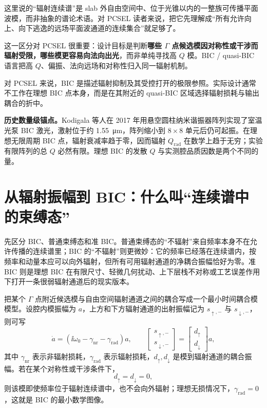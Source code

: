 这里说的“辐射连续谱”是 slab 外自由空间中、位于光锥以内的一整族可传播平面波模，而非抽象的谱论术语。对 PCSEL 读者来说，把它先理解成“所有允许向上、向下逃逸的远场平面波通道的连续集合”就足够了。

这一区分对 PCSEL 很重要：设计目标是判断\textbf{哪些 $\Gamma$ 点候选模因对称性或干涉而辐射受限，哪些模更容易向法向出光}，而非单纯寻找高 $Q$ 模。BIC / quasi-BIC 语言把高 $Q$、偏振、法向远场和对称性归入同一辐射机制。

\begin{IntuitionBox}
对 PCSEL 来说，BIC 是描述辐射抑制及其受控打开的极限参照。实际设计通常不工作在理想 BIC 点本身，而是在其附近的 quasi-BIC 区域选择辐射损耗与输出耦合的折中。
\end{IntuitionBox}

\begin{ExampleBox}
\textbf{历史数量级锚点。}Kodigala 等人在 2017 年用悬空圆柱纳米谐振器阵列实现了室温光泵 BIC 激光，激射位于约 \SI{1.55}{\micro\meter}，阵列缩小到 $8\times8$ 单元后仍可起振\cite{kodigala2017}。在理想无限周期 BIC 点，辐射衰减率趋于零，因而辐射 $Q_{\mathrm{rad}}$ 在数学上趋于无穷；实验有限阵列的总 $Q$ 必然有限。理想 BIC 的发散 $Q$ 与实测腔品质因数是两个不同的量。
\end{ExampleBox}

\section{从辐射振幅到 BIC：什么叫“连续谱中的束缚态”}
先区分 BIC、普通束缚态和准 BIC。普通束缚态的“不辐射”来自频率本身不在允许传播的连续谱里；BIC 的“不辐射”则更微妙：它的频率已经落在连续谱内，按频率和动量本应可以向外辐射，但所有可用辐射通道的净耦合振幅恰好为零。准 BIC 则是理想 BIC 在有限尺寸、轻微几何扰动、上下层栈不对称或工艺误差作用下打开一条很弱辐射通道后的现实版本。

把某个 $\Gamma$ 点附近候选模与自由空间辐射通道之间的耦合写成一个最小时间耦合模模型。设腔内模振幅为 $a$，上方和下方辐射通道的出射振幅记为 $s_{\uparrow,-}$ 与 $s_{\downarrow,-}$，则可写
\begin{equation}
\dot a
=
\left(\ii\omega_0-\gamma_{\mathrm{nr}}-\gamma_{\mathrm{rad}}\right)a,
\qquad
\begin{bmatrix}
s_{\uparrow,-}\\
s_{\downarrow,-}
\end{bmatrix}
=
\begin{bmatrix}
d_\uparrow\\
d_\downarrow
\end{bmatrix} a,
\label{eq:bic_tcmt}
\end{equation}
其中 $\gamma_{\mathrm{nr}}$ 表示非辐射损耗，$\gamma_{\mathrm{rad}}$ 表示辐射损耗，$d_\uparrow,d_\downarrow$ 是模到辐射通道的耦合振幅。若在某个对称性或干涉条件下，
\begin{equation}
d_\uparrow = d_\downarrow = 0,
\label{eq:bic_condition}
\end{equation}
则该模即使频率位于辐射连续谱中，也不会向外辐射；理想无损情况下，$\gamma_{\mathrm{rad}}=0$，这就是 BIC 的最小数学图像。

